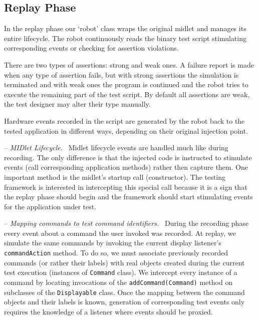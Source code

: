 \documentclass{llncs}
\newcommand{\internalsection}[1]{\par\medskip\noindent-- \emph{#1}~}
\newcommand{\method}[1]{\texttt{#1}}       %
\newcommand{\class}[1]{\texttt{#1}}        %
\begin{document}
\subsection{Replay Phase} %

In the replay phase our `robot' class wraps the original midlet and manages its entire lifecycle. 
The robot continuously reads the binary test script stimulating corresponding events or checking 
for assertion violations. 

There are two types of assertions: strong and weak ones. A failure report is made when any type
of assertion fails, but with strong assertions the simulation is terminated and with
weak ones the program is continued and the robot tries to execute the remaining part of the test script. 
By default all assertions are weak, the test designer may alter their type manually.

Hardware events recorded in the script are generated by the robot back to the tested application in different ways,
depending on their original injection point.

\internalsection{MIDlet Lifecycle.} Midlet lifecycle events are handled much like during recording. The
only difference is that the injected code is instructed to stimulate events (call corresponding
application methods) rather then capture them. One important method is the midlet's startup call (constructor).
The testing framework is interested in intercepting this special call because it is a sign that the replay phase
should begin and the framework should start stimulating events for the application under test.

\internalsection{Mapping commands to test command identifiers.} During the recording phase every event about a
command the user invoked was recorded. At replay, we simulate the same commands by invoking the
current display listener's \method{commandAction} method. To do so, we must associate previously
recorded commands (or rather their labels) with real objects created during the current test execution
(instances of \texttt{Command} class). We intercept every instance of a command by locating
invocations of the \method{addCommand(Command)} method on subclasses of the \class{Displayable} class. Once
the mapping between the command objects and their labels is known, generation of corresponding test
events only requires the knowledge of a listener where events should be proxied.
\end{document}
